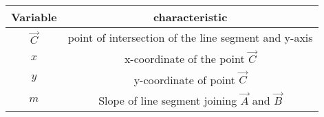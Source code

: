 \begin{tabular}[12pt]{|c|c|}
\hline
\textbf{Variable}&\textbf{characteristic}\\
\hline
$\vec{C}$&point of intersection of the line segment and y-axis\\
\hline
$x$&x-coordinate of the point $\vec{C}$\\
\hline
$y$&y-coordinate of point $\vec{C}$\\
\hline
$m$&Slope of line segment joining $\vec{A}$ and $\vec{B}$\\
\hline
\end{tabular}